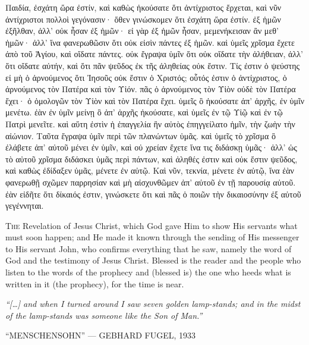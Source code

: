 \begin{pages}
\begin{Rightside}
	 	Παιδία, ἐσχάτη ὥρα ἐστίν, καὶ καθὼς ἠκούσατε ὅτι ἀντίχριστος ἔρχεται, καὶ νῦν ἀντίχριστοι πολλοὶ γεγόνασιν· ὅθεν γινώσκομεν ὅτι ἐσχάτη ὥρα ἐστίν. ἐξ ἡμῶν ἐξῆλθαν, ἀλλ’ οὐκ ἦσαν ἐξ ἡμῶν· εἰ γὰρ ἐξ ἡμῶν ἦσαν, μεμενήκεισαν ἂν μεθ’ ἡμῶν· ἀλλ’ ἵνα φανερωθῶσιν ὅτι οὐκ εἰσὶν πάντες ἐξ ἡμῶν. καὶ ὑμεῖς χρῖσμα ἔχετε ἀπὸ τοῦ Ἁγίου, καὶ οἴδατε πάντες. οὐκ ἔγραψα ὑμῖν ὅτι οὐκ οἴδατε τὴν ἀλήθειαν, ἀλλ’ ὅτι οἴδατε αὐτήν, καὶ ὅτι πᾶν ψεῦδος ἐκ τῆς ἀληθείας οὐκ ἔστιν. Τίς ἐστιν ὁ ψεύστης εἰ μὴ ὁ ἀρνούμενος ὅτι Ἰησοῦς οὐκ ἔστιν ὁ Χριστός; οὗτός ἐστιν ὁ ἀντίχριστος, ὁ ἀρνούμενος τὸν Πατέρα καὶ τὸν Υἱόν. πᾶς ὁ ἀρνούμενος τὸν Υἱὸν οὐδὲ τὸν Πατέρα ἔχει· ὁ ὁμολογῶν τὸν Υἱὸν καὶ τὸν Πατέρα ἔχει. ὑμεῖς ὃ ἠκούσατε ἀπ’ ἀρχῆς, ἐν ὑμῖν μενέτω. ἐὰν ἐν ὑμῖν μείνῃ ὃ ἀπ’ ἀρχῆς ἠκούσατε, καὶ ὑμεῖς ἐν τῷ Υἱῷ καὶ ἐν τῷ Πατρὶ μενεῖτε. καὶ αὕτη ἐστὶν ἡ ἐπαγγελία ἣν αὐτὸς ἐπηγγείλατο ἡμῖν, τὴν ζωὴν τὴν αἰώνιον. Ταῦτα ἔγραψα ὑμῖν περὶ τῶν πλανώντων ὑμᾶς. καὶ ὑμεῖς τὸ χρῖσμα ὃ ἐλάβετε ἀπ’ αὐτοῦ μένει ἐν ὑμῖν, καὶ οὐ χρείαν ἔχετε ἵνα τις διδάσκῃ ὑμᾶς· ἀλλ’ ὡς τὸ αὐτοῦ χρῖσμα διδάσκει ὑμᾶς περὶ πάντων, καὶ ἀληθές ἐστιν καὶ οὐκ ἔστιν ψεῦδος, καὶ καθὼς ἐδίδαξεν ὑμᾶς, μένετε ἐν αὐτῷ. Καὶ νῦν, τεκνία, μένετε ἐν αὐτῷ, ἵνα ἐὰν φανερωθῇ σχῶμεν παρρησίαν καὶ μὴ αἰσχυνθῶμεν ἀπ’ αὐτοῦ ἐν τῇ παρουσίᾳ αὐτοῦ. ἐὰν εἰδῆτε ὅτι δίκαιός ἐστιν, γινώσκετε ὅτι καὶ πᾶς ὁ ποιῶν τὴν δικαιοσύνην ἐξ αὐτοῦ γεγέννηται.
		\pend
        \endnumbering
    \end{Rightside}
    \begin{Leftside}
        \beginnumbering
        	\renewcommand\LettrineFontHook{\Zallmanfamily}
		\lettrine[lines=3]{T}{he} Revelation of Jesus Christ, which God gave Him to show His servants what must soon happen; and He made it known through the sending of His messenger to His servant John, who confirms everything that he saw, namely the word of God and the testimony of Jesus Christ. Blessed is the reader and the people who listen to the words of the prophecy and (blessed is) the one who heeds what is written in it (the prophecy), for the time is near.
		\pend
        \endnumbering
    \end{Leftside}

\end{pages} 
\Pages

\clearpage
\thispagestyle{empty}
\null\vfill
\settowidth{}
\begin{center}
\parbox{\longest}{%
  \raggedright{\huge\itshape%
    ``[…] and when I turned around I saw seven golden lamp-stands; and in the midst of the lamp-stands was someone like the Son of Man.'' \par\bigskip
  }
  \raggedleft\Large\MakeUppercase{``Menschensohn'' — Gebhard Fugel, 1933}\par%
}
\vfill\vfill
\clearpage\newpage
\end{center}
\newpage
\thispagestyle{empty}
\begin{center}
\end{center}